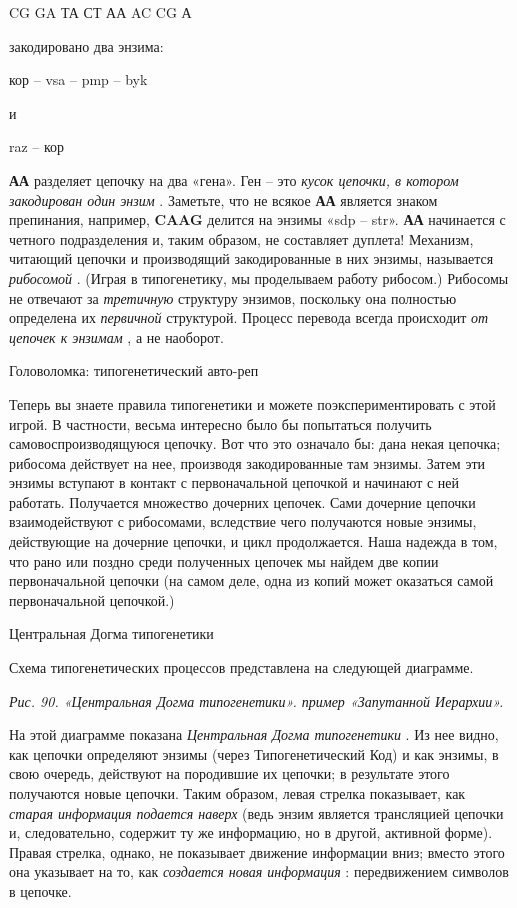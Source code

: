 \documentclass[../main.tex]{subfiles}
\begin{document}
CG GA ТА СТ АА AC CG А

закодировано два энзима:

кор \--- vsa \--- pmp \--- byk

и

raz \--- кор

\textbf{АА} разделяет цепочку на два «гена». Ген \--- это \emph{кусок цепочки, в котором закодирован один энзим} . Заметьте, что не всякое \textbf{АА} является знаком препинания, например, \textbf{CAAG} делится на энзимы «sdp \--- str». \textbf{АА} начинается с четного подразделения и, таким образом, не составляет дуплета! Механизм, читающий цепочки и производящий закодированные в них энзимы, называется \emph{рибосомой} . (Играя в типогенетику, мы проделываем работу рибосом.) Рибосомы не отвечают за \emph{третичную} структуру энзимов, поскольку она полностью определена их \emph{первичной} структурой. Процесс перевода всегда происходит \emph{от цепочек к энзимам} , а не наоборот.

Головоломка: типогенетический авто-реп

Теперь вы знаете правила типогенетики и можете поэкспериментировать с этой игрой. В частности, весьма интересно было бы попытаться получить самовоспроизводящуюся цепочку. Вот что это означало бы: дана некая цепочка; рибосома действует на нее, производя закодированные там энзимы. Затем эти энзимы вступают в контакт с первоначальной цепочкой и начинают с ней работать. Получается множество дочерних цепочек. Сами дочерние цепочки взаимодействуют с рибосомами, вследствие чего получаются новые энзимы, действующие на дочерние цепочки, и цикл продолжается. Наша надежда в том, что рано или поздно среди полученных цепочек мы найдем две копии первоначальной цепочки (на самом деле, одна из копий может оказаться самой первоначальной цепочкой.)

Центральная Догма типогенетики

Схема типогенетических процессов представлена на следующей диаграмме.

\emph{Рис. 90. «Центральная Догма типогенетики». пример «Запутанной Иерархии».}

На этой диаграмме показана \emph{Центральная Догма типогенетики} . Из нее видно, как цепочки определяют энзимы (через Типогенетический Код) и как энзимы, в свою очередь, действуют на породившие их цепочки; в результате этого получаются новые цепочки. Таким образом, левая стрелка показывает, как \emph{старая информация подается наверх} (ведь энзим является трансляцией цепочки и, следовательно, содержит ту же информацию, но в другой, активной форме). Правая стрелка, однако, не показывает движение информации вниз; вместо этого она указывает на то, как \emph{создается новая информация} : передвижением символов в цепочке.
\end{document}
